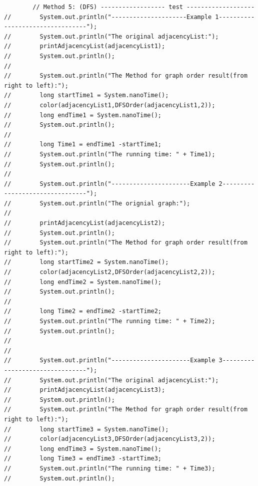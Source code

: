 \documentclass{article}
\begin{document}
\begin{verbatim}
        // Method 5: (DFS) ------------------ test -------------------
//        System.out.println("---------------------Example 1---------------------------------");
//        System.out.println("The original adjacencyList:");
//        printAdjacencyList(adjacencyList1);
//        System.out.println();
//
//        System.out.println("The Method for graph order result(from right to left):");
//        long startTime1 = System.nanoTime();
//        color(adjacencyList1,DFSOrder(adjacencyList1,2));
//        long endTime1 = System.nanoTime();
//        System.out.println();
//
//        long Time1 = endTime1 -startTime1;
//        System.out.println("The running time: " + Time1);
//        System.out.println();
//
//        System.out.println("----------------------Example 2--------------------------------");
//        System.out.println("The orignial graph:");
//
//        printAdjacencyList(adjacencyList2);
//        System.out.println();
//        System.out.println("The Method for graph order result(from right to left):");
//        long startTime2 = System.nanoTime();
//        color(adjacencyList2,DFSOrder(adjacencyList2,2));
//        long endTime2 = System.nanoTime();
//        System.out.println();
//
//        long Time2 = endTime2 -startTime2;
//        System.out.println("The running time: " + Time2);
//        System.out.println();
//
//
//        System.out.println("----------------------Example 3--------------------------------");
//        System.out.println("The original adjacencyList:");
//        printAdjacencyList(adjacencyList3);
//        System.out.println();
//        System.out.println("The Method for graph order result(from right to left):");
//        long startTime3 = System.nanoTime();
//        color(adjacencyList3,DFSOrder(adjacencyList3,2));
//        long endTime3 = System.nanoTime();
//        long Time3 = endTime3 -startTime3;
//        System.out.println("The running time: " + Time3);
//        System.out.println();



\end{verbatim}
\end{document}
